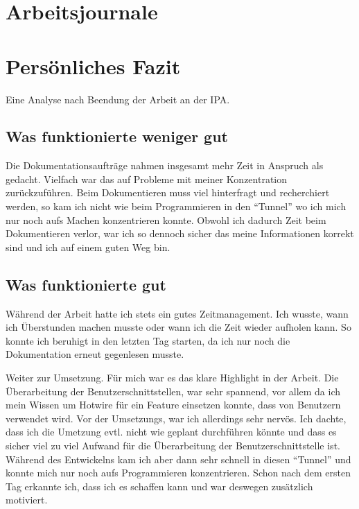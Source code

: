 

\chapter{Arbeitsjournale}













\chapter{Persönliches Fazit}
Eine Analyse nach Beendung der Arbeit an der IPA.

\section{Was funktionierte weniger gut}
Die Dokumentationsaufträge nahmen insgesamt mehr Zeit in Anspruch als gedacht. Vielfach war das auf Probleme mit meiner Konzentration zurückzuführen.
Beim Dokumentieren muss viel hinterfragt und recherchiert werden, so kam ich nicht wie beim Programmieren in den ``Tunnel'' wo ich mich nur noch aufs Machen konzentrieren konnte.
Obwohl ich dadurch Zeit beim Dokumentieren verlor, war ich so dennoch sicher das meine Informationen korrekt sind und ich auf einem guten Weg bin.

\section{Was funktionierte gut}
Während der Arbeit hatte ich stets ein gutes Zeitmanagement. Ich wusste, wann ich Überstunden machen musste oder wann ich die Zeit
wieder aufholen kann. So konnte ich beruhigt in den letzten Tag starten, da ich nur noch die Dokumentation erneut gegenlesen musste.

Weiter zur Umsetzung. Für mich war es das klare Highlight in der Arbeit. Die Überarbeitung der Benutzerschnittstellen, war sehr spannend,
vor allem da ich mein Wissen um Hotwire für ein Feature einsetzen konnte, dass von Benutzern verwendet wird. Vor der Umsetzungs, war ich allerdings sehr nervös.
Ich dachte, dass ich die Umetzung evtl. nicht wie geplant durchführen könnte und dass es sicher viel zu viel Aufwand für die Überarbeitung der Benutzerschnittstelle ist.
Während des Entwickelns kam ich aber dann sehr schnell in diesen ``Tunnel'' und konnte mich nur noch aufs Programmieren konzentrieren. Schon nach dem ersten Tag erkannte ich,
dass ich es schaffen kann und war deswegen zusätzlich motiviert.

